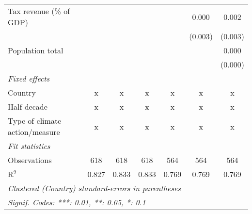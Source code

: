 \begin{tabular}{lcccccc}
   Tax revenue (\% of GDP)                                         &               &                &                &                & 0.000          & 0.002\\   
                                                                   &               &                &                &                & (0.003)        & (0.003)\\   
   Population total                                                &               &                &                &                &                & 0.000\\   
                                                                   &               &                &                &                &                & (0.000)\\   
   \emph{Fixed effects}\\
   Country                                                         & x             & x              & x              & x              & x              & x\\  
   Half decade                                                     & x             & x              & x              & x              & x              & x\\  
   Type of climate action/measure                                  & x             & x              & x              & x              & x              & x\\  
   \midrule \emph{Fit statistics}\\
   Observations                                                    & 618           & 618            & 618            & 564            & 564            & 564\\  
   R$^2$                                                           & 0.827         & 0.833          & 0.833          & 0.769          & 0.769          & 0.769\\  
   \midrule
   \multicolumn{7}{l}{\emph{Clustered (Country) standard-errors in parentheses}}\\
   \multicolumn{7}{l}{\emph{Signif. Codes: ***: 0.01, **: 0.05, *: 0.1}}\\
\end{tabular}
\par\endgroup


